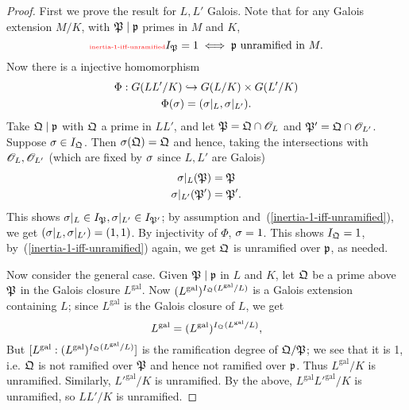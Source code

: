 \begin{proof}
First we prove the result for $L,L'$ Galois. Note that for any Galois extension $M/K$, with $\mathfrak{P}\mid \mathfrak{p}$ primes in $M$ and $K$,
\begin{equation}\llabel{inertia-1-iff-unramified}
I_{\mP}=1\iff \mfp\text{ unramified in }M.
\end{equation}
Now there is a injective homomorphism
\begin{gather*}
\Phi:G(LL'/K)\hookrightarrow G(L/K)\times G(L'/K)\\
\Phi(\sigma)=(\sigma|_L,\sigma|_{L'}).
\end{gather*}
Take $\mathfrak{Q}\mid \mathfrak{p}$ with $\mathfrak{Q}$ a prime in $LL'$, and let $\mathfrak{P}=\mathfrak{Q}\cap \mathscr{O}_L$ and $\mathfrak{P}'=\mathfrak{Q}\cap \mathscr{O}_{L'}$. Suppose $\sigma\in I_{\mathfrak{Q}}$. Then $\sigma(\mathfrak{Q})=\mathfrak{Q}$ and hence, taking the intersections with $\mathscr{O}_L,\mathscr{O}_{L'}$ (which are fixed by $\sigma$ since $L,L'$ are Galois)
\begin{align*}
\sigma|_{L}(\mathfrak{P})&=\mathfrak{P}\\
\sigma|_{L'}(\mathfrak{P}')&=\mathfrak{P}'.
\end{align*}
This shows $\sigma|_{L}\in I_{\mathfrak{P}},\sigma|_{L'}\in I_{\mathfrak{P}'}$; by assumption and~(\ref{inertia-1-iff-unramified}), we get $(\sigma|_L,\sigma|_{L'})=(1,1)$. By injectivity of $\Phi$, $\sigma=1$. This shows $I_{\mathfrak{Q}}=1$, by~(\ref{inertia-1-iff-unramified}) again, we get $\mathfrak{Q}$ is unramified over $\mathfrak{p}$, as needed.

Now consider the general case. Given $\mathfrak{P}\mid \mathfrak{p}$ in $L$ and $K$, let $\mathfrak{Q}$ be a prime above $\mathfrak{P}$ in the Galois closure $L^{\text{gal}}$. Now $(L^{\text{gal}})^{I_{\mathfrak{Q}}(L^{\text{gal}}/L)}$ is a Galois extension containing $L$; since $L^{\text{gal}}$ is the Galois closure of $L$, we get
\[
L^{\text{gal}}=(L^{\text{gal}})^{I_{\mathfrak{Q}}(L^{\text{gal}}/L)},
\]
But $[L^{\text{gal}}:(L^{\text{gal}})^{I_{\mathfrak{Q}}(L^{\text{gal}}/L)}]$ is the ramification degree of $\mathfrak{Q}/\mathfrak{P}$; we see that it is 1, i.e. $\mathfrak{Q}$ is not ramified over $\mathfrak{P}$ and hence not ramified over $\mathfrak{p}$. Thus $L^{\text{gal}}/K$ is unramified. Similarly, $L'^{\text{gal}}/K$ is unramified. By the above, $L^{\text{gal}}L'^{\text{gal}}/K$ is unramified, so $LL'/K$ is unramified.
\end{proof}

